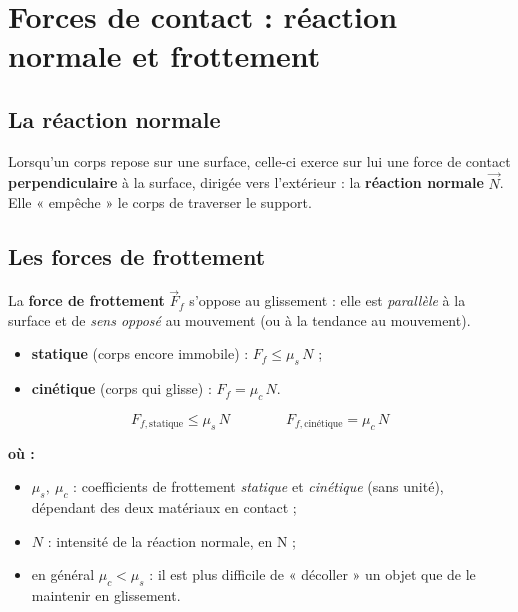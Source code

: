 \documentclass[11pt,a4paper]{article}
\newenvironment{ou}{%
  \par\smallskip\noindent\textbf{où :}\nopagebreak
  \begin{itemize}[leftmargin=1.8em,topsep=2pt,itemsep=1.5pt,parsep=0pt]}%
  {\end{itemize}}
\newcommand{\vv}[1]{\vec{#1}}
\begin{document}
\section{Forces de contact : réaction normale et frottement}

\subsection{La réaction normale}
\begin{definition}
Lorsqu'un corps repose sur une surface, celle-ci exerce sur lui une force de contact
\textbf{perpendiculaire} à la surface, dirigée vers l'extérieur : la \textbf{réaction normale} $\vv N$.
Elle « empêche » le corps de traverser le support.
\end{definition}

\subsection{Les forces de frottement}
\begin{definition}
La \textbf{force de frottement} $\vv F_f$ s'oppose au glissement : elle est \emph{parallèle} à la
surface et de \emph{sens opposé} au mouvement (ou à la tendance au mouvement).
\begin{itemize}[leftmargin=1.6em,topsep=2pt,itemsep=1.5pt]
  \item \textbf{statique} (corps encore immobile) : $F_f\le \mu_s\,N$ ;
  \item \textbf{cinétique} (corps qui glisse) : $F_f=\mu_c\,N$.
\end{itemize}
\end{definition}

\begin{formule}
\[ F_{f,\text{statique}}\le \mu_s\,N\qquad\qquad \boxed{F_{f,\text{cinétique}}=\mu_c\,N} \]
\begin{ou}
  \item $\mu_s,\ \mu_c$ : coefficients de frottement \emph{statique} et \emph{cinétique} (sans unité), dépendant des deux matériaux en contact ;
  \item $N$ : intensité de la réaction normale, en \si{\newton} ;
  \item en général $\mu_c<\mu_s$ : il est plus difficile de « décoller » un objet que de le maintenir en glissement.
\end{ou}
\end{formule}
\end{document}
